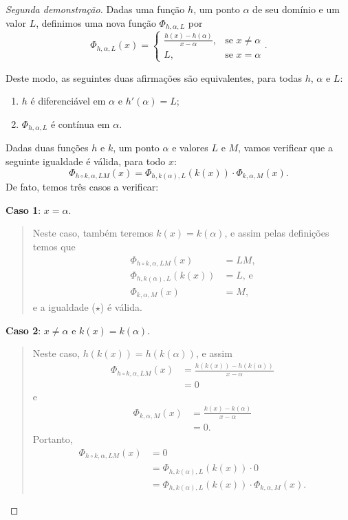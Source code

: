 \begin{proof}[Segunda demonstração]
	Dadas uma função $h$, um ponto $\alpha$ de seu domínio e um valor $L$, definimos uma nova função $\Phi_{h,\alpha,L}$ por
	\[\Phi_{h,\alpha,L}(x)=\begin{cases}\frac{h(x)-h(\alpha)}{x-\alpha},&\text{se }x\neq\alpha\\L,&\text{se }x=\alpha\end{cases}.\]
	
	Deste modo, as seguintes duas afirmações são equivalentes, para todas $h$, $\alpha$ e $L$:
	\begin{enumerate}
		\item $h$ é diferenciável em $\alpha$ e $h'(\alpha)=L$;
		\item $\Phi_{h,\alpha,L}$ é contínua em $\alpha$.
	\end{enumerate}
	
	Dadas duas funções $h$ e $k$, um ponto $\alpha$ e valores $L$ e $M$, vamos verificar que a seguinte igualdade é válida, para todo $x$:
	\[\Phi_{h\circ k,\alpha,LM}(x)=\Phi_{h,k(\alpha),L}(k(x))\cdot\Phi_{k,\alpha,M}(x).\tag{$\star$}\]
	De fato, temos três casos a verificar:
	
	\textbf{Caso 1}: $x=\alpha$.
	\begin{quote}
		Neste caso, também teremos $k(x)=k(\alpha)$, e assim pelas definições temos que
		\begin{align*}
			\Phi_{h\circ k,\alpha,LM}(x)&=LM\text{,}\\
			\Phi_{h,k(\alpha),L}(k(x))&=L\text{, e}\\
			\Phi_{k,\alpha,M}(x)&=M\text{,}
		\end{align*}
		e a igualdade ($\star$) é válida.
	\end{quote}
	
	\textbf{Caso 2}: $x\neq \alpha$ e $k(x)=k(\alpha)$.
	\begin{quote}
		Neste caso, $h(k(x))=h(k(\alpha))$, e assim
		\begin{align*}
			\Phi_{h\circ k,\alpha,LM}(x)
				&=\frac{h(k(x))-h(k(\alpha))}{x-\alpha}\\
				&=0
		\end{align*}
		e
		\begin{align*}
			\Phi_{k,\alpha,M}(x)
				&=\frac{k(x)-k(\alpha)}{x-\alpha}\\
				&=0.
		\end{align*}
		Portanto,
		\begin{align*}
			\Phi_{h\circ k,\alpha,LM}(x)
				&=0\\
				&=\Phi_{h,k(\alpha),L}(k(x))\cdot 0\\
				&=\Phi_{h,k(\alpha),L}(k(x))\cdot \Phi_{k,\alpha,M}(x).
		\end{align*}
	\end{quote}
	

\end{proof}
